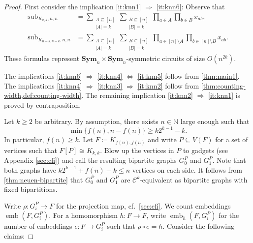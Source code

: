 \documentclass[11pt, DIV=15]{scrarticle}
\theoremstyle{definition}
\theoremstyle{plain}
\theoremstyle{remark}
\DeclareMathOperator{\sub}{sub}
\DeclareMathOperator{\emb}{emb}
\newcommand{\Sym}{\mathbf{Sym}}
\begin{document}
	\begin{proof}
		First consider the implication \ref{it:knn1} $\Rightarrow$ \ref{it:knn6}:
		Observe that
		\begin{align*}
			\sub_{K_{k,k}, n,n} &= \sum_{\substack{A \subseteq [n] \\ |A| = k}}\sum_{\substack{B \subseteq [n] \\ |B| = k}} \prod_{a \in A} \prod_{b \in B} x_{ab}, \\
			\sub_{K_{n-k,n-k}, n,n} &= \sum_{\substack{A \subseteq [n] \\ |A| = k}}\sum_{\substack{B \subseteq [n] \\ |B| = k}} \prod_{a \in [n] \setminus A} \prod_{b \in [n] \setminus B} x_{ab}.
		\end{align*}
		These formulas represent $\Sym_n \times \Sym_n$-symmetric circuits of size $O(n^{2k})$.
		
		The implications \ref{it:knn6} $\Rightarrow$ \ref{it:knn4} $\Leftrightarrow$ \ref{it:knn5} follow from \cref{thm:main1}.
		The implications \ref{it:knn4} $\Rightarrow$ \ref{it:knn3} $\Rightarrow$ \ref{it:knn2} follow from \cref{thm:counting-width,def:counting-width}.
		The remaining implication \ref{it:knn2} $\Rightarrow$ \ref{it:knn1} is proved by contraposition.
		
		Let $k \geq 2$ be arbitrary.
		By assumption, there exists $n \in \mathbb{N}$ large enough such that
		\[
			\min\{ f(n), n - f(n) \} \geq  k2^{k-1} - k.
		\]
		In particular,  $f(n) \geq k$.
		Let $F \coloneqq K_{f(n), f(n)}$ and write $P \subseteq V(F)$ for a set of vertices such that $F[P] \cong K_{k,k}$.
		Blow up the vertices in $P$ to  gadgets (see Appendix \ref{sec:cfi}) and call the resulting bipartite graphs $G_0^P$ and $G_1^P$.
		Note that both graphs have $k 2^{k-1} + f(n) - k \leq n$ vertices on each side.
		It follows from \cref{thm:neuen-bipartite} that
		$G_0^P$ and $G_1^P$ are $\mathcal{C}^k$-equivalent as bipartite graphs with fixed bipartitions.
		
		Write $\rho \colon G_i^P \to F$ for the projection map, cf.\ \cref{sec:cfi}.
		We count embeddings $\emb(F, G_i^P)$.
		For a homomorphism $h \colon F \to F$, 
		write $\emb_h(F, G_i^P)$ for the number of embeddings $e \colon F \to G_i^P$ such that $\rho \circ e = h$.
		Consider the following claims:
		

\end{proof}
\end{document}
